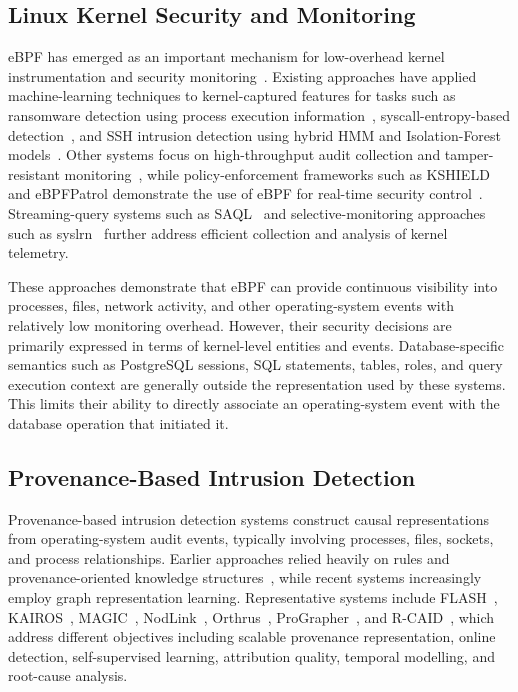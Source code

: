 \documentclass[conference]{IEEEtran}
\begin{document}
\subsection{Linux Kernel Security and Monitoring}

eBPF has emerged as an important mechanism for low-overhead kernel instrumentation and security monitoring~\cite{ebpfsurvey,eaudit,tamperlog,ebpfpatrol}. Existing approaches have applied machine-learning techniques to kernel-captured features for tasks such as ransomware detection using process execution information~\cite{ransomware_ebpf}, syscall-entropy-based detection~\cite{ransomware_ml}, and SSH intrusion detection using hybrid HMM and Isolation-Forest models~\cite{ssh_hmm}. Other systems focus on high-throughput audit collection and tamper-resistant monitoring~\cite{eaudit,tamperlog}, while policy-enforcement frameworks such as KSHIELD and eBPFPatrol demonstrate the use of eBPF for real-time security control~\cite{kshield,ebpfpatrol}. Streaming-query systems such as SAQL~\cite{saql} and selective-monitoring approaches such as syslrn~\cite{syslrn} further address efficient collection and analysis of kernel telemetry.

These approaches demonstrate that eBPF can provide continuous visibility into processes, files, network activity, and other operating-system events with relatively low monitoring overhead. However, their security decisions are primarily expressed in terms of kernel-level entities and events. Database-specific semantics such as PostgreSQL sessions, SQL statements, tables, roles, and query execution context are generally outside the representation used by these systems. This limits their ability to directly associate an operating-system event with the database operation that initiated it.

\subsection{Provenance-Based Intrusion Detection}

Provenance-based intrusion detection systems construct causal representations from operating-system audit events, typically involving processes, files, sockets, and process relationships. Earlier approaches relied heavily on rules and provenance-oriented knowledge structures~\cite{shadewatcher}, while recent systems increasingly employ graph representation learning. Representative systems include FLASH~\cite{flash}, KAIROS~\cite{kairos}, MAGIC~\cite{magic}, NodLink~\cite{nodlink}, Orthrus~\cite{orthrus}, ProGrapher~\cite{prographer}, and R-CAID~\cite{rcaid}, which address different objectives including scalable provenance representation, online detection, self-supervised learning, attribution quality, temporal modelling, and root-cause analysis.
\end{document}
